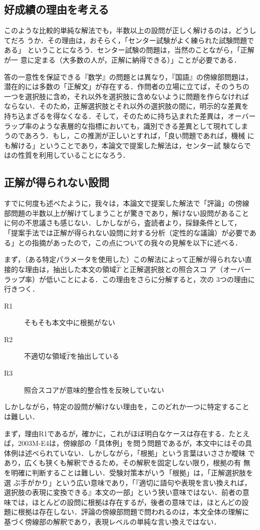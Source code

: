 \documentclass[japanese]{jnlp_1.4}
\begin{document}
\subsection{好成績の理由を考える}

このような比較的単純な解法でも，半数以上の設問が正しく解けるのは，どうしてだろ
うか．その理由は，おそらく，「センター試験がよく練られた試験問題である」
ということになろう．センター試験の問題は，当然のことながら，「正解が一
意に定まる（大多数の人が，正解に納得できる）」ことが必要である．

答の一意性を保証できる『数学』の問題とは異なり，『国語』の傍線部問題は，
潜在的には多数の「正解文」が存在する．作問者の立場に立てば，そのうちの
一つを選択肢に含め，それ以外を選択肢に含めないように問題を作らなければ
ならない．そのため，正解選択肢とそれ以外の選択肢の間に，明示的な差異を
持ち込まざるを得なくなる．そして，そのために持ち込まれた差異は，オーバー
ラップ率のような表層的な指標においても，識別できる差異として現れてしま
うのであろう．もし，この推測が正しいとすれば，「良い問題であれば，機械
にも解ける」ということであり，本論文で提案した解法は，センター試
験ならではの性質を利用していることになろう．


\subsection{正解が得られない設問}

すでに何度も述べたように，我々は，本論文で提案した解法で「評論」の傍線
部問題の半数以上が解けてしまうことが驚きであり，解けない設問があること
に何の不思議さも感じない．しかしながら，査読者より，採録条件として，
「提案手法では正解が得られない設問に対する分析（定性的な議論）が必要であ
る」との指摘があったので，この点についての我々の見解を以下に述べる．

まず，（ある特定パラメータを使用した）この解法によって正解が得られない直
接的な理由は，抽出した本文の領域$\widehat{T}$ と正解選択肢との照合スコ
ア（オーバーラップ率）が低いことによる．この理由をさらに分解すると，次の
3つの理由に行きつく．
\begin{description}
\item[R1] そもそも本文中に根拠がない
\item[R2] 不適切な領域$\widehat{T}$を抽出している
\item[R3] 照合スコアが意味的整合性を反映していない
\end{description}
しかしながら，特定の設問が解けない理由を，このどれか一つに特定すること
は難しい．

まず，理由R1であるが，確かに，これがほぼ明白なケースは存在する．たとえ
ば，2003M-E4は，傍線部の「具体例」を問う問題であるが，本文中にはその具
体例は述べられていない．しかしながら，「根拠」という言葉はいささか曖昧
であり，広くも狭くも解釈できるため，その解釈を固定しない限り，根拠の有
無を明確に判断することは難しい．受験対策本がいう「根拠」は，「正解選択肢を選
ぶ手がかり」という広い意味であり，「『適切に語句や表現を言い換えれば，
選択肢の表現に変換できる』本文の一部」という狭い意味ではない．前者の意
味では，ほとんどの設問に根拠は存在するが，後者の意味では，ほとんどの設
題に根拠は存在しない．評論の傍線部問題で問われるのは，本文全体の理解に
基づく傍線部の解釈であり，表現レベルの単純な言い換えではない．
\end{document}
